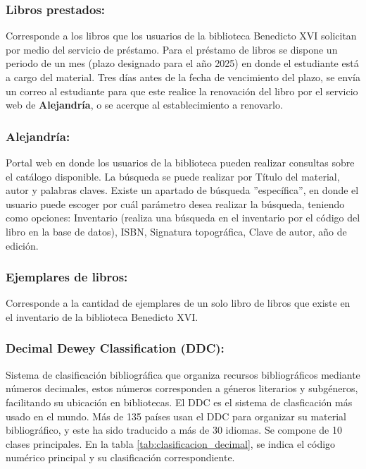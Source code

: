 \documentclass[spanish]{ieee_upb}
\begin{document}
    \subsubsection{Libros prestados: }Corresponde a los libros que los usuarios de la biblioteca Benedicto XVI solicitan por medio del servicio de préstamo. Para el préstamo de libros se dispone un periodo de un mes (plazo designado para el año 2025) en donde el estudiante está a cargo del material. Tres días antes de la fecha de vencimiento del plazo, se envía un correo al estudiante para que este realice la renovación del libro por el servicio web de \textbf{Alejandría}, o se acerque al establecimiento a renovarlo. 

    
    \subsubsection{Alejandría: }Portal web en donde los usuarios de la biblioteca pueden realizar consultas sobre el catálogo disponible. La búsqueda se puede realizar por Título del material, autor y palabras claves. Existe un apartado de búsqueda ''específica'', en donde el usuario puede escoger por cuál parámetro desea realizar la búsqueda, teniendo como opciones: Inventario (realiza una búsqueda en el inventario por el código del libro en la base de datos), ISBN, Signatura topográfica, Clave de autor, año de edición.
    
    \subsubsection{Ejemplares de libros: } Corresponde a la cantidad de ejemplares de un solo libro de libros que existe en el inventario de la biblioteca Benedicto XVI.

\subsubsection{Decimal Dewey Classification (DDC):} Sistema de clasificación bibliográfica que organiza recursos bibliográficos mediante números decimales, estos números corresponden a géneros literarios y subgéneros, facilitando su ubicación en bibliotecas.
 El DDC es el sistema de clasficación más usado en el mundo.
  Más de 135 países usan el DDC para organizar su material 
  bibliográfico, y este ha 
  sido traducido a más de 30 idiomas\cite{oclc_dewey}. 
  Se compone de 10 clases principales. En la tabla \ref{tab:clasificacion_decimal}, se indica el código numérico principal y su clasificación correspondiente.
\end{document}
